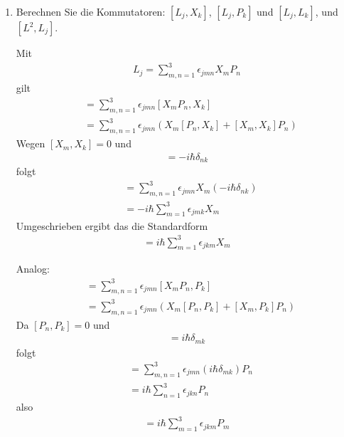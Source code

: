 \documentclass[11pt,a4paper]{scrartcl}
\begin{document}
\begin{enumerate}[label=(\alph*)]
    \item Berechnen Sie die Kommutatoren: $[L_j,X_k]$, $[L_j,P_k]$ und $[L_j,L_k]$, und $[L^2,L_j]$.
    \begin{tcolorbox}[title=Berechnung, breakable]
        Mit
        \begin{align*}
            L_j = \sum\limits_{m,n=1}^3 \epsilon_{jmn}X_mP_n
        \end{align*}
        gilt
        \begin{align*}
            [L_j,X_k] &= \sum\limits_{m,n=1}^3 \epsilon_{jmn}[X_mP_n,X_k]\\
            &= \sum\limits_{m,n=1}^3 \epsilon_{jmn}\left(X_m[P_n,X_k] + [X_m,X_k]P_n\right)
        \end{align*}
        Wegen $[X_m,X_k]=0$ und
        \begin{align*}
            [P_n,X_k] = -i\hbar \delta_{nk}
        \end{align*}
        folgt
        \begin{align*}
            [L_j,X_k] &= \sum\limits_{m,n=1}^3 \epsilon_{jmn}X_m(-i\hbar\delta_{nk})\\
            &= -i\hbar \sum\limits_{m=1}^3 \epsilon_{jmk}X_m
        \end{align*}
        Umgeschrieben ergibt das die Standardform
        \begin{align*}
            [L_j,X_k] = i\hbar \sum\limits_{m=1}^3 \epsilon_{jkm}X_m
        \end{align*}

        Analog:
        \begin{align*}
            [L_j,P_k] &= \sum\limits_{m,n=1}^3 \epsilon_{jmn}[X_mP_n,P_k]\\
            &= \sum\limits_{m,n=1}^3 \epsilon_{jmn}\left(X_m[P_n,P_k] + [X_m,P_k]P_n\right)
        \end{align*}
        Da $[P_n,P_k]=0$ und
        \begin{align*}
            [X_m,P_k] = i\hbar \delta_{mk}
        \end{align*}
        folgt
        \begin{align*}
            [L_j,P_k] &= \sum\limits_{m,n=1}^3 \epsilon_{jmn}(i\hbar\delta_{mk})P_n\\
            &= i\hbar \sum\limits_{n=1}^3 \epsilon_{jkn}P_n
        \end{align*}
        also
        \begin{align*}
            [L_j,P_k] = i\hbar \sum\limits_{m=1}^3 \epsilon_{jkm}P_m
        \end{align*}


\end{tcolorbox}
\end{enumerate}
\end{document}
